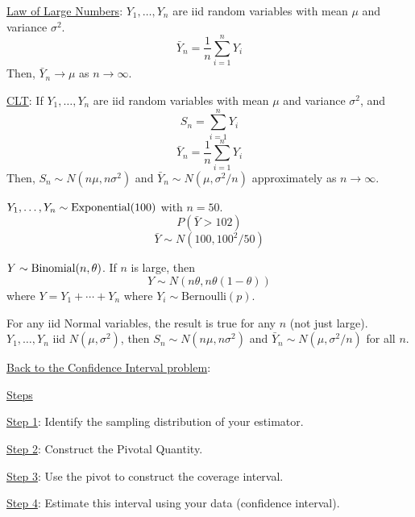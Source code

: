 \underline{Law of Large Numbers}: $ Y_1,\ldots ,Y_n $ are iid random
variables with mean $ \mu $ and variance $ \sigma^2 $.
\[ \bar{Y}_n=\frac{1}{n} \sum\limits_{i=1}^{n} Y_i \]
Then, $ \bar{Y}_n\to \mu $ as $ n\to \infty $.

\underline{CLT}: If $ Y_1,\ldots ,Y_n $ are iid random variables
with mean $ \mu $ and variance $ \sigma^2 $, and
\[ S_n=\sum\limits_{i=1}^{n} Y_i \]
\[ \bar{Y}_n=\frac{1}{n} \sum\limits_{i=1}^{n} Y_i \]
Then, $ S_n \sim N(n\mu,n\sigma^2) $ and $ \bar{Y}_n
    \sim N(\mu,\sigma^2/n) $ approximately as $ n\to \infty $.
\begin{exbox}
    \begin{example}
        $ Y_1,\ldots ,Y_n \sim \operatorname{Exponential}(100) $ with $ n=50 $.
        \[ P\left(\bar{Y}>102\right) \]
        \[ \bar{Y} \sim N(100,100^2/50) \]
    \end{example}
\end{exbox}
\begin{exbox}
    \begin{example}
        $ Y \sim \operatorname{Binomial}(n,\theta) $. If $ n $ is large, then
        \[ Y \sim N(n\theta,n\theta(1-\theta)) \]
        where $ Y=Y_1+\cdots+Y_n $ where $ Y_i \sim \text{Bernoulli}(p) $.
    \end{example}
\end{exbox}
\begin{exbox}
    \begin{example}
        For any iid Normal variables, the result is true for any $ n $ (not just large).
        $ Y_1,\ldots ,Y_n $ iid $ N(\mu,\sigma^2) $, then $ S_n \sim N(n\mu,n\sigma^2) $
        and $ \bar{Y}_n \sim N(\mu,\sigma^2/n) $ for all $ n $.
    \end{example}
\end{exbox}
\underline{Back to the Confidence Interval problem}:

\underline{Steps}

\underline{Step 1}: Identify the sampling distribution of your estimator.

\underline{Step 2}: Construct the Pivotal Quantity.

\underline{Step 3}: Use the pivot to construct the coverage interval.

\underline{Step 4}: Estimate this interval using your data (confidence interval).

